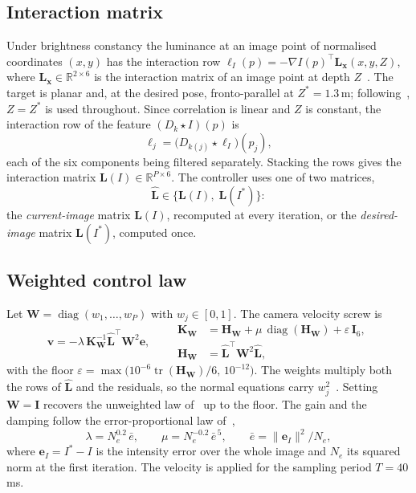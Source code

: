 \documentclass[preprint,12pt]{elsarticle}
\theoremstyle{remark}
\newcommand{\Lh}{\widehat{\mathbf{L}}}
\newcommand{\W}{\mathbf{W}}
\newcommand{\HW}{\mathbf{H}_{\mathbf{W}}}
\newcommand{\KW}{\mathbf{K}_{\mathbf{W}}}
\newcommand{\e}{\mathbf{e}}
\newcommand{\vc}{\mathbf{v}}
\newcommand{\tr}{\operatorname{tr}}
\newcommand{\diag}{\operatorname{diag}}
\begin{document}
\subsection{Interaction matrix}
Under brightness constancy the luminance at an image point of normalised
coordinates $(x,y)$ has the interaction row
$\boldsymbol{\ell}_{I}(p)=-\nabla I(p)^{\top}\mathbf{L}_{\mathbf{x}}(x,y,Z)$,
where $\mathbf{L}_{\mathbf{x}}\in\mathbb{R}^{2\times6}$ is the interaction
matrix of an image point at depth $Z$~\cite{chaumette2006vs1,collewet2011photometric}.
The target is planar and, at the desired pose, fronto-parallel at
$Z^{*}=1.3$\,m; following~\cite{herpvs}, $Z=Z^{*}$ is used throughout. Since
correlation is linear and $Z$ is constant, the interaction row of the feature
$(D_{k}\star I)(p)$ is
\begin{equation}
\boldsymbol{\ell}_{j}=\bigl(D_{k(j)}\star\boldsymbol{\ell}_{I}\bigr)(p_{j}),
\label{eq:hermite-row}
\end{equation}
each of the six components being filtered separately. Stacking the rows gives
the interaction matrix $\mathbf{L}(I)\in\mathbb{R}^{P\times6}$. The controller
uses one of two matrices,
\begin{equation}
\Lh\in\bigl\{\mathbf{L}(I),\;\mathbf{L}(I^{*})\bigr\}:
\label{eq:L-choice}
\end{equation}
the \emph{current-image} matrix $\mathbf{L}(I)$, recomputed at every
iteration, or the \emph{desired-image} matrix $\mathbf{L}(I^{*})$, computed
once.

\subsection{Weighted control law}
Let $\W=\diag(w_{1},\dots,w_{P})$ with $w_{j}\in[0,1]$. The camera velocity
screw is
\begin{equation}
\vc=-\lambda\,\KW^{-1}\Lh^{\top}\W^{2}\e,\qquad
\begin{aligned}
\KW&=\HW+\mu\,\diag(\HW)+\varepsilon\,\mathbf{I}_{6},\\
\HW&=\Lh^{\top}\W^{2}\Lh,
\end{aligned}
\label{eq:law}
\end{equation}
with the floor $\varepsilon=\max\bigl(10^{-6}\tr(\HW)/6,\,10^{-12}\bigr)$. The
weights multiply both the rows of $\Lh$ and the residuals, so the normal
equations carry $w_{j}^{2}$~\cite{comport2006robust}. Setting $\W=\mathbf{I}$
recovers the unweighted law of~\cite{herpvs} up to the floor. The gain and the
damping follow the error-proportional law of~\cite{herpvs},
\begin{equation}
\lambda=N_{e}^{0.2}\,\bar e,\qquad \mu=N_{e}^{-0.2}\,\bar e^{\,5},\qquad
\bar e=\lVert\e_{I}\rVert^{2}/N_{e},
\label{eq:gains}
\end{equation}
where $\e_{I}=I^{*}-I$ is the intensity error over the whole image and $N_{e}$
its squared norm at the first iteration. The velocity is applied for the
sampling period $T=40$\,ms.
\end{document}
